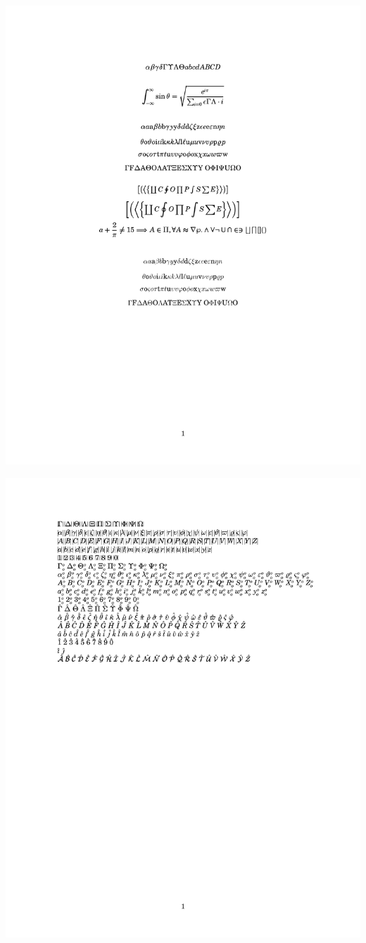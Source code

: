 \documentclass[twocolumn]{article}
\begin{document}
\noindent\includegraphics*{../results/newcent-font}\par
{}
\noindent\includegraphics*{../results/newcent-pos}\par
\end{document}
